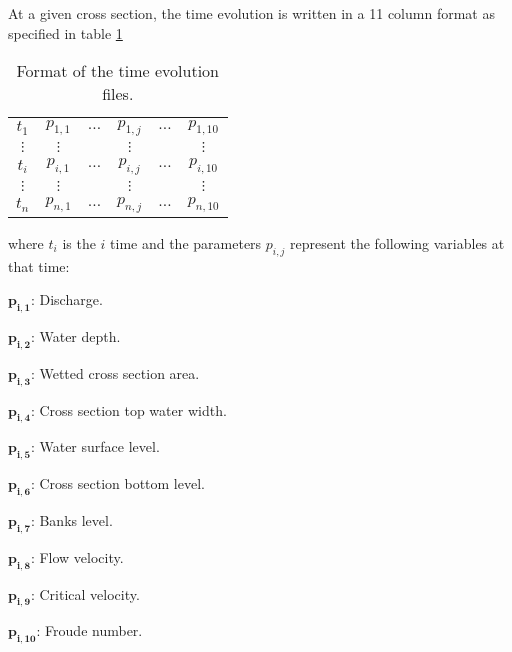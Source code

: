 \documentclass[a4paper,12pt]{article}
\newcommand{\TABLE}[4]
{
	\begin{table}[ht!]\centering
	\begin{tabular}{#1}\hline#2\\\hline\end{tabular}
	\caption{#3.\label{#4}}\end{table}
}
\begin{document}
At a given cross section, the time evolution is written in a 11 column format as
specified in table \ref{TabEvolucion}
\TABLE{cccccc}
{
	$t_1$&$p_{1,1}$&$\dots$&$p_{1,j}$&$\dots$&$p_{1,10}$\\
	$\vdots$&$\vdots$&&$\vdots$&&$\vdots$\\
	$t_i$&$p_{i,1}$&$\dots$&$p_{i,j}$&$\dots$&$p_{i,10}$\\
	$\vdots$&$\vdots$&&$\vdots$&&$\vdots$\\
	$t_n$&$p_{n,1}$&$\dots$&$p_{n,j}$&$\dots$&$p_{n,10}$
}{Format of the time evolution files}{TabEvolucion}
where $t_i$ is the $i$ time and the parameters $p_{i,j}$ represent the following
variables at that time:
\begin{description}
\item $\mathbf{p_{i,1}}$: Discharge.
\item $\mathbf{p_{i,2}}$: Water depth.
\item $\mathbf{p_{i,3}}$: Wetted cross section area.
\item $\mathbf{p_{i,4}}$: Cross section top water width.
\item $\mathbf{p_{i,5}}$: Water surface level.
\item $\mathbf{p_{i,6}}$: Cross section bottom level.
\item $\mathbf{p_{i,7}}$: Banks level.
\item $\mathbf{p_{i,8}}$: Flow velocity.
\item $\mathbf{p_{i,9}}$: Critical velocity.
\item $\mathbf{p_{i,10}}$: Froude number.
\end{description}
\end{document}
